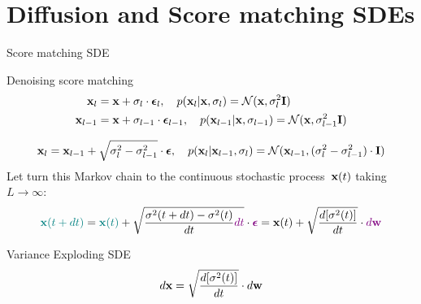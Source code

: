 \section{Diffusion and Score matching SDEs}
\begin{frame}{Score matching SDE}
	\begin{block}{Denoising score matching}
		\vspace{-0.7cm}
		\begin{align*}
			\mathbf{x}_l &= \mathbf{x} + \sigma_l \cdot \boldsymbol{\epsilon}_l, \quad p(\mathbf{x}_l | \mathbf{x}, \sigma_l) = \mathcal{N}(\mathbf{x}, \sigma_l^2 \mathbf{I}) \\
			\mathbf{x}_{l-1} &= \mathbf{x} + \sigma_{l-1} \cdot \boldsymbol{\epsilon}_{l-1}, \quad p(\mathbf{x}_{l-1} | \mathbf{x}, \sigma_{l-1}) = \mathcal{N}(\mathbf{x}, \sigma_{l-1}^2 \mathbf{I})
		\end{align*}
	\end{block}
	\vspace{-0.7cm}
	\[
		\mathbf{x}_l = \mathbf{x}_{l - 1} + \sqrt{\sigma^2_l - \sigma^2_{l-1}} \cdot \boldsymbol{\epsilon}, \quad p(\mathbf{x}_l | \mathbf{x}_{l-1}, \sigma_l) = \mathcal{N}(\mathbf{x}_{l-1}, (\sigma_l^2 - \sigma_{l-1}^2) \cdot \mathbf{I})
	\]
	Let turn this Markov chain to the continuous stochastic process~$\mathbf{x}(t)$ taking $L \rightarrow \infty$:
	\[
		{\color{teal}\mathbf{x}(t + dt)} = {\color{teal}\mathbf{x}(t)} + \sqrt{\frac{\sigma^2(t + dt) - \sigma^2(t)}{dt} {\color{violet}dt}} \cdot {\color{violet}\boldsymbol{\epsilon}} = \mathbf{x}(t) + \sqrt{\frac{ d [\sigma^2(t)]}{dt}} \cdot {\color{violet}d \mathbf{w}}
	\]
	\vspace{-0.5cm}
	\begin{block}{Variance Exploding SDE}
		\vspace{-0.3cm}
		\[
			d \mathbf{x} = \sqrt{\frac{ d [\sigma^2(t)]}{dt}} \cdot d \mathbf{w}
		\]
	\end{block}
\end{frame}

